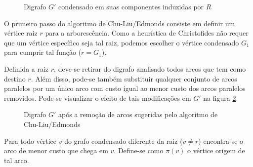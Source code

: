 \documentclass[12pt, a4paper]{article}
\begin{document}
\begin{enumerate}
\begin{figure}[H]
\begin{tikzpicture}[node distance=3cm, every loop/.style={},thick,main node/.style={circle,draw,font=\sffamily\Large}]
                \end{tikzpicture}
                \caption{Digrafo $G'$ condensado em suas componentes induzidas por $R$}
                \label{condensated-dig}
            \end{figure}

                O primeiro passo do algoritmo de Chu-Liu/Edmonds consiste em definir um vértice raiz $r$ para a arborescência.
                Como a heurística de Christofides não requer que um vértice específico seja tal raiz, podemos escolher o vértice condensado $G_1$ para cumprir tal função ($r = G_1$). 

                Definida a raiz $r$, deve-se retirar do digrafo analisado todos arcos que tem como destino $r$.
                Além disso, pode-se também substituir qualquer conjunto de arcos paralelos por um único arco com custo igual ao menor custo dos arcos paralelos removidos. 
                Pode-se visualizar o efeito de tais modificações em $G'$ na figura \ref{chu-liu}.

            \begin{figure}[H]
                \centering
                \caption{Digrafo $G'$ após a remoção de arcos sugeridas pelo algoritmo de Chu-Liu/Edmonds}
                \label{chu-liu}
            \end{figure}

            Para todo vértice $v$ do grafo condensado diferente da raiz ($v \neq r$) encontra-se o arco de menor custo que chega em $v$.
            Define-se como $\pi(v)$ o vértice origem de tal arco.


\end{enumerate}
\end{document}
